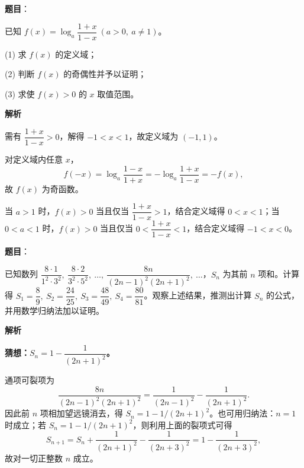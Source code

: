 \begin{answer}

\textbf{题目}：

已知 $f(x)=\log_a\dfrac{1+x}{1-x}\ (a>0,\ a\ne1)$。

(1) 求 $f(x)$ 的定义域；

(2) 判断 $f(x)$ 的奇偶性并予以证明；

(3) 求使 $f(x)>0$ 的 $x$ 取值范围。

\textbf{解析}


需有 \(\dfrac{1+x}{1-x}>0\)，解得 \(-1<x<1\)，故定义域为 \((-1,1)\)。


对定义域内任意 \(x\)，
\nopagebreak[4]
\[
f(-x)=\log_a\frac{1-x}{1+x}=-\log_a\frac{1+x}{1-x}=-f(x),
\]
故 \(f(x)\) 为奇函数。


当 \(a>1\) 时，\(f(x)>0\) 当且仅当 \(\dfrac{1+x}{1-x}>1\)，结合定义域得 \(0<x<1\)；当 \(0<a<1\) 时，\(f(x)>0\) 当且仅当 \(0<\dfrac{1+x}{1-x}<1\)，结合定义域得 \(-1<x<0\)。




\end{answer}
\begin{answer}

\textbf{题目}：

已知数列 $\dfrac{8\cdot1}{1^2\cdot3^2},\ \dfrac{8\cdot2}{3^2\cdot5^2},\ \ldots,\ \dfrac{8n}{(2n-1)^2(2n+1)^2},\ \ldots$，$S_n$ 为其前 $n$ 项和。计算得 $S_1=\dfrac89,\ S_2=\dfrac{24}{25},\ S_3=\dfrac{48}{49},\ S_4=\dfrac{80}{81}$。观察上述结果，推测出计算 $S_n$ 的公式，并用数学归纳法加以证明。

\textbf{解析}

\textbf{猜想：$S_n=1-\dfrac1{(2n+1)^2}$。}

通项可裂项为
\nopagebreak[4]
\[
\frac{8n}{(2n-1)^2(2n+1)^2}
=\frac1{(2n-1)^2}-\frac1{(2n+1)^2}.
\]
因此前 $n$ 项相加望远镜消去，得 $S_n=1-1/(2n+1)^2$。也可用归纳法：$n=1$ 时成立；若 $S_n=1-1/(2n+1)^2$，则利用上面的裂项式可得
\nopagebreak[4]
\[
S_{n+1}=S_n+\frac1{(2n+1)^2}-\frac1{(2n+3)^2}
=1-\frac1{(2n+3)^2},
\]
故对一切正整数 $n$ 成立。


\end{answer}
